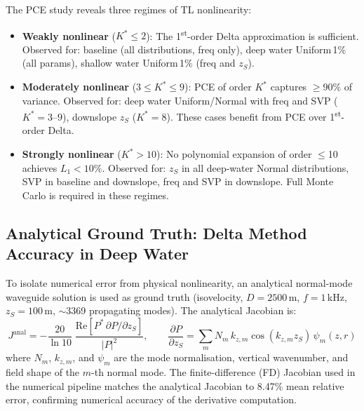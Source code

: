 \documentclass[11pt,a4paper]{article}
\begin{document}
The PCE study reveals three regimes of TL nonlinearity:
\begin{itemize}
  \item \textbf{Weakly nonlinear} ($K^* \leq 2$): The 1\textsuperscript{st}-order Delta
        approximation is sufficient. Observed for: baseline (all distributions, freq only),
        deep water Uniform\,1\% (all params), shallow water Uniform\,1\% (freq and $z_S$).
  \item \textbf{Moderately nonlinear} ($3 \leq K^* \leq 9$): PCE of order $K^*$ captures
        $\geq$90\% of variance. Observed for: deep water Uniform/Normal with freq and SVP
        ($K^* = 3$--$9$), downslope $z_S$ ($K^*=8$).
        These cases benefit from PCE over 1\textsuperscript{st}-order Delta.
  \item \textbf{Strongly nonlinear} ($K^* > 10$): No polynomial expansion of order
        $\leq$10 achieves $L_1 < 10\%$. Observed for: $z_S$ in all deep-water
        Normal distributions, SVP in baseline and downslope, freq and SVP in downslope.
        Full Monte Carlo is required in these regimes.
\end{itemize}

\subsection{Analytical Ground Truth: Delta Method Accuracy in Deep Water}
\label{sec:analytical}

To isolate numerical error from physical nonlinearity, an analytical normal-mode
waveguide solution is used as ground truth (isovelocity, $D=2500$\,m, $f=1$\,kHz,
$z_S = 100$\,m, $\sim$3369 propagating modes).
The analytical Jacobian is:
\begin{equation}
  J^{\mathrm{anal}} = -\frac{20}{\ln 10}
  \;\frac{\mathrm{Re}\!\left[P^*\,\partial P/\partial z_S\right]}{|P|^2},
  \qquad
  \frac{\partial P}{\partial z_S} = \sum_m N_m\,k_{z,m}\cos(k_{z,m} z_S)\,\psi_m(z,r)
\end{equation}
where $N_m$, $k_{z,m}$, and $\psi_m$ are the mode normalisation, vertical
wavenumber, and field shape of the $m$-th normal mode.
The finite-difference (FD) Jacobian used in the numerical pipeline matches the
analytical Jacobian to 8.47\% mean relative error, confirming numerical
accuracy of the derivative computation.
\end{document}
